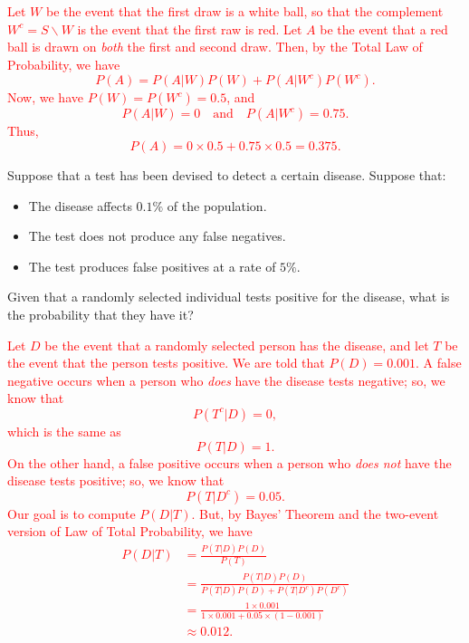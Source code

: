 \documentclass[12pt,reqno]{amsart}
\begin{document}
\bigskip
\textcolor{red}{Let $W$ be the event that the first draw is a white ball, so that the complement $W^c = S\smallsetminus W$ is the event that the first raw is red. Let $A$ be the event that a red ball is drawn on \textit{both} the first and second draw. Then, by the Total Law of Probability, we have
    \[P(A) = P(A|W)P(W) + P(A|W^c)P(W^c).\]
Now, we have $P(W) = P(W^c) = 0.5$, and
    \[P(A|W) = 0 \quad \text{and} \quad P(A|W^c) = 0.75.\]
Thus,
    \[P(A) = 0 \times 0.5 + 0.75 \times 0.5 = 0.375.\]}























\bigskip
\prob Suppose that a test has been devised to detect a certain disease. Suppose that:

\begin{itemize}
    \item The disease affects $0.1\%$ of the population.
    \item The test does not produce any false negatives.
    \item The test produces false positives at a rate of $5\%$.
\end{itemize}

Given that a randomly selected individual tests positive for the disease, what is the probability that they have it?

\bigskip
\textcolor{red}{Let $D$ be the event that a randomly selected person has the disease, and let $T$ be the event that the person tests positive. We are told that $P(D) = 0.001$. A false negative occurs when a person who \textit{does} have the disease tests negative; so, we know that
    \[P(T^c|D) =0, \]
which is the same as
    \[P(T|D) =1.\]
On the other hand, a false positive occurs when a person who \textit{does not} have the disease tests positive; so, we know that
    \[P(T|D^c) = 0.05.\]
Our goal is to compute $P(D|T)$. But, by Bayes' Theorem and the two-event version of Law of Total Probability, we have
    \begin{align*} P(D|T) &= \frac{P(T|D)P(D)}{P(T)} \\ &= \frac{P(T|D)P(D)}{P(T|D)P(D) + P(T|D^c)P(D^c)} \\ &= \frac{1\times 0.001}{1 \times 0.001 + 0.05 \times (1-0.001)} \\ &\approx 0.012. \end{align*}}
\end{document}
